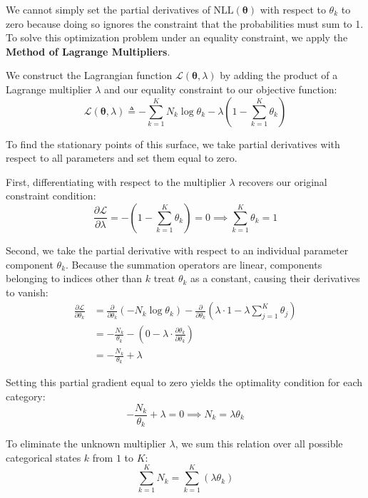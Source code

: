 \documentclass{article}
\begin{document}
We cannot simply set the partial derivatives of $\text{NLL}(\boldsymbol{\theta})$ with respect to $\theta_k$ to zero because doing so ignores the constraint that the probabilities must sum to 1. To solve this optimization problem under an equality constraint, we apply the \textbf{Method of Lagrange Multipliers}.

We construct the Lagrangian function $\mathcal{L}(\boldsymbol{\theta}, \lambda)$ by adding the product of a Lagrange multiplier $\lambda$ and our equality constraint to our objective function:
\begin{equation}
\mathcal{L}(\boldsymbol{\theta}, \lambda) \triangleq -\sum_{k=1}^K N_k \log \theta_k - \lambda \left( 1 - \sum_{k=1}^K \theta_k \right)
\end{equation}

To find the stationary points of this surface, we take partial derivatives with respect to all parameters and set them equal to zero. 

First, differentiating with respect to the multiplier $\lambda$ recovers our original constraint condition:
\begin{equation}
\frac{\partial \mathcal{L}}{\partial \lambda} = -\left( 1 - \sum_{k=1}^K \theta_k \right) = 0 \implies \sum_{k=1}^K \theta_k = 1
\end{equation}

Second, we take the partial derivative with respect to an individual parameter component $\theta_k$. Because the summation operators are linear, components belonging to indices other than $k$ treat $\theta_k$ as a constant, causing their derivatives to vanish:
\begin{align*}
\frac{\partial \mathcal{L}}{\partial \theta_k} &= \frac{\partial}{\partial \theta_k} \left( -N_k \log \theta_k \right) - \frac{\partial}{\partial \theta_k} \left( \lambda \cdot 1 - \lambda \sum_{j=1}^K \theta_j \right) \\
&= -\frac{N_k}{\theta_k} - \left( 0 - \lambda \cdot \frac{\partial \theta_k}{\partial \theta_k} \right) \\
&= -\frac{N_k}{\theta_k} + \lambda
\end{align*}

Setting this partial gradient equal to zero yields the optimality condition for each category:
\begin{equation}
-\frac{N_k}{\theta_k} + \lambda = 0 \implies N_k = \lambda \theta_k
\end{equation}

To eliminate the unknown multiplier $\lambda$, we sum this relation over all possible categorical states $k$ from $1$ to $K$:
\begin{equation}
\sum_{k=1}^K N_k = \sum_{k=1}^K (\lambda \theta_k)
\end{equation}
\end{document}
